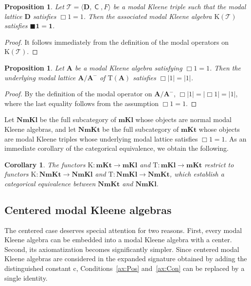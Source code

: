 \documentclass{article}
\newtheorem{proposition}[theorem]{Proposition}
\newtheorem{corollary}[theorem]{Corollary}
\DeclareMathOperator{\con}{\mathsf{C}}
\newcommand{\cn}{\mathrm{c}}
\newcommand{\one}{\mathbf{1}}
\newcommand{\A}{\mathbf{A}}
\newcommand{\D}{\mathbf{D}}
\newcommand{\T}{\mathcal{T}}
\newcommand{\boxn}{\blacksquare}
\begin{document}
\begin{proposition}
Let $\T=\langle\D,\con,F\rangle$ be a modal Kleene triple such that the modal lattice $\D$ satisfies $\Box 1=1$. Then the associated modal Kleene algebra $\mathrm{K}(\T)$ satisfies $\boxn \one=\one$.
\end{proposition}
\begin{proof}
It follows immediately from the definition of the modal operators on $\mathrm{K}(\T)$. 
\end{proof}

\begin{proposition}
Let $\A$ be a modal Kleene algebra satisfying $\Box 1=1$. Then the underlying modal lattice $\mathbf{A/A^{-}}$ of $\mathrm{T}(\A)$ satisfies $\Box |1|=|1|$.
\end{proposition}
\begin{proof}
By the definition of the modal operator on $\mathbf{A/A^{-}}$, $\Box|1|=|\Box1|=|1|$,
where the last equality follows from the assumption $\Box1=1$.
\end{proof}

Let $\mathbf{NmKl}$ be the full subcategory of $\mathbf{mKl}$ whose objects are normal modal Kleene algebras, and let $\mathbf{NmKt}$ be the full subcategory of $\mathbf{mKt}$ whose objects are modal Kleene triples whose underlying modal lattice satisfies $\Box1=1$. As an immediate corollary of the categorical equivalence, we obtain the following.

\begin{corollary}
The functors $\mathrm{K}:\mathbf{mKt}\to\mathbf{mKl}$ and $\mathrm{T}:\mathbf{mKl}\to\mathbf{mKt}$ restrict to functors $\mathrm{K}:\mathbf{NmKt}\to\mathbf{NmKl}$ and $\mathrm{T}:\mathbf{NmKl}\to\mathbf{NmKt}$, which establish a categorical equivalence between $\mathbf{NmKt}$ and $\mathbf{NmKl}$.
\end{corollary}

 \subsection{Centered modal Kleene algebras}\label{subsec:centered}

The centered case deserves special attention for two reasons. First, every modal Kleene algebra can be embedded into a modal Kleene algebra with a center. Second, its axiomatization becomes significantly simpler. Since centered modal Kleene algebras are considered in the expanded signature obtained by adding the distinguished constant $\cn$, Conditions~\eqref{ax:Pos} and~\eqref{ax:Con} can be replaced by a single identity.
\end{document}
